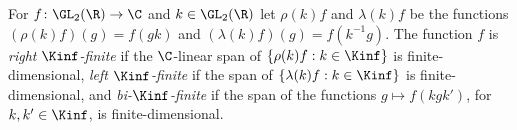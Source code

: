 For $f\colon\GL_2(\R)\to\C$ and $k\in\GL_2(\R)$ let $\rho(k)f$ and $\lambda(k)f$ be the functions
$(\rho(k)f)(g)=f(gk)$ and $(\lambda(k)f)(g)=f(k^{-1}g)$. The function $f$ is \emph{right $\Kinf$-finite} if the
$\C$-linear span of $\{\rho(k)f:k\in\Kinf\}$ is finite-dimensional, \emph{left $\Kinf$-finite} if the span of
$\{\lambda(k)f:k\in\Kinf\}$ is finite-dimensional, and \emph{bi-$\Kinf$-finite} if the span of the functions
$g\mapsto f(kgk')$, for $k,k'\in\Kinf$, is finite-dimensional.

